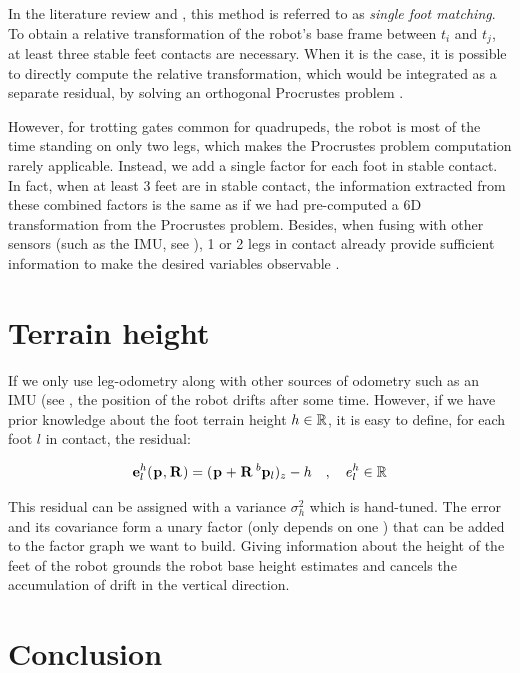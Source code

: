 In the literature review and , this method is referred to as \textit{single foot matching}. To obtain
a relative transformation of the robot's base frame between $t_i$ and $t_j$, at least three stable feet contacts are necessary. When it is the case, it is possible to directly compute the
relative transformation, which would be integrated as a separate residual, by solving an orthogonal Procrustes problem \cite{roston1991dead}.

However, for trotting gates common for quadrupeds, the robot is most of the time standing on only two legs, which makes the Procrustes problem computation rarely applicable. 
Instead, we add a single factor for each foot in stable contact. In fact, when at least 3 feet are in stable contact, the information extracted from these combined factors 
is the same as if we had pre-computed a 6D transformation from the Procrustes problem. Besides, when fusing with other sensors (such as the IMU,
see ), 1 or 2 legs in contact already provide sufficient information to make the desired variables observable \cite{bloesch2013state}.



\section{Terrain height}
If we only use leg-odometry along with other sources of odometry such as an IMU (see , the position of the robot drifts after some time. 
However, if we have prior knowledge about the foot terrain height $h \in \mathbb{R}$, it is easy to define, for each foot $l$ in contact, the residual:

\begin{equation}
    {\bf e}^h_l(\prescript{}{}{{\bf p}}_{}, \prescript{}{}{{\bf R}}_{}) = (\prescript{}{}{{\bf p}}_{} + \prescript{}{}{{\bf R}}_{} \prescript{b}{}{{\bf p}}_{l})_z - h \quad, \quad e^{h}_l \in \mathbb{R}
\end{equation}

This residual can be assigned with a variance $\sigma_h^2$ which is hand-tuned. 
The error and its covariance form a unary factor (only depends on one \keyframe) that can be added to the factor graph we want to build.
Giving information about the height of the feet of the robot grounds the robot base height estimates and cancels the accumulation of drift in the vertical direction.






\section{Conclusion}

